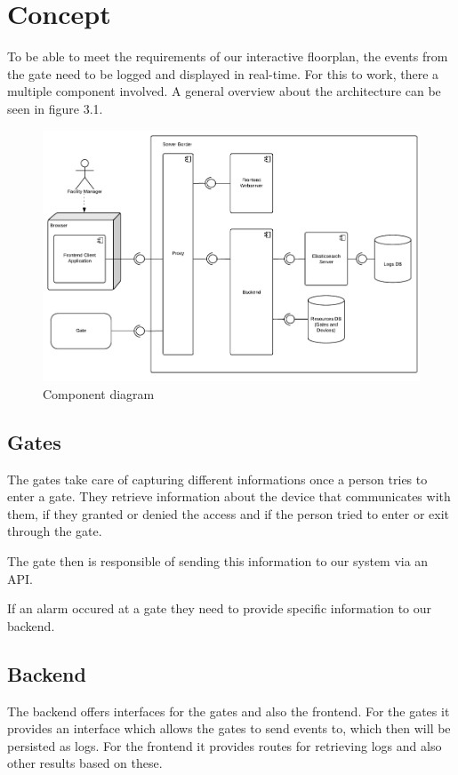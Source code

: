 \section{Concept}
To be able to meet the requirements of our interactive floorplan, the events from the gate need to be logged and displayed in real-time. For this to work, there a multiple component involved. A general overview about the architecture can be seen in figure 3.1.

\begin{figure}[!hb]
	\centering
	\includegraphics[width=0.9\linewidth]{images/Komponentendiagramm}
	\caption{Component diagram}
	\label{fig:Komponentendiagramm}
\end{figure}

\subsection{Gates}
\label{Gates}

The gates take care of capturing different informations once a person tries to enter a gate. They retrieve information about the device that communicates with them, if they granted or denied the access and if the person tried to enter or exit through the gate.

The gate then is responsible of sending this information to our system via an API.

If an alarm occured at a gate they need to provide specific information to our backend.

\subsection{Backend}
\label{Backend}

The backend offers interfaces for the gates and also the frontend. For the gates it provides an interface which allows the gates to send events to, which then will be persisted as logs.
For the frontend it provides routes for retrieving logs and also other results based on these.

